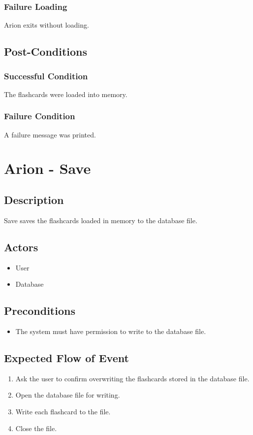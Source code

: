 \documentclass{scrreprt}
\begin{document}
    \subsection{Failure Loading}
    Arion exits without loading.

\section{Post-Conditions}
    \subsection{Successful Condition}
    The flashcards were loaded into memory.

    \subsection{Failure Condition}
    A failure message was printed.

\chapter{Arion - Save}

\section{Description}
Save saves the flashcards loaded in memory to the database file.

\section{Actors}
\begin{itemize}
    \item User
    \item Database
\end{itemize}

\section{Preconditions}
\begin{itemize}
    \item The system must have permission to write to the database file.
\end{itemize}

\section{Expected Flow of Event}
\begin{enumerate}[1.]
    \item Ask the user to confirm overwriting the flashcards stored in the database file.
    \item Open the database file for writing.
    \item Write each flashcard to the file.
    \item Close the file.
\end{enumerate}
\end{document}
